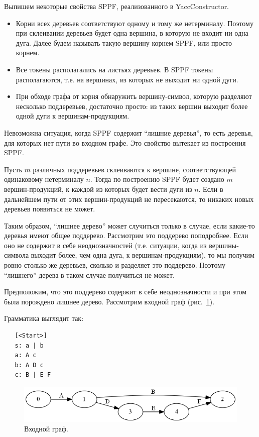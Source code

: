 Выпишем некоторые свойства SPPF, реализованного в YaccConstructor. 
\begin{itemize}
\item Корни всех деревьев соответствуют одному и тому же нетерминалу. Поэтому при склеивании деревьев будет одна вершина, в которую не входит ни одна дуга. Далее будем называть такую вершину корнем SPPF, или просто корнем. 
\item Все токены располагались на листьях деревьев. В SPPF токены располагаются, т.е. на вершинах, из которых не выходит ни одной дуги.
\item При обходе графа от корня обнаружить вершину-символ, которую разделяют несколько поддеревьев, достаточно просто: из таких вершин выходит более одной дуги к вершинам-продукциям. 
\end{itemize}

Невозможна ситуация, когда SPPF содержит ``лишние деревья'', то есть деревья, для которых нет пути во входном графе. Это свойство вытекает из построения SPPF. 

Пусть $m$ различных поддеревьев склеиваются к вершине, соответствующей одинаковому нетерминалу $n$. Тогда по построению SPPF будет создано $m$ вершин-продукций, к каждой из которых будет вести дуги из $n$. Если в дальнейшем пути от этих вершин-продукций не пересекаются, то никаких новых деревьев появиться не может. 

Таким образом, ``лишнее дерево'' может случиться только в случае, если какие-то деревья имеют общее поддерево. Рассмотрим это поддерево поподробнее. Если оно не содержит в себе неоднозначностей (т.е. ситуации, когда из вершины-символа выходит более, чем одна дуга, к вершинам-продукциям), то мы получим ровно столько же деревьев, сколько и разделяет это поддерево. Поэтому ``лишнего'' дерева в таком случае получиться не может. 

Предположим, что это поддерево содержит в себе неоднозначности и при этом была порождено лишнее дерево. Рассмотрим входной граф (рис.~\ref{sppf_proof_input}). 

Грамматика выглядит так:

\begin{verbatim}
   [<Start>]
   s: a | b
   a: A c
   b: A D c
   c: B | E F
\end{verbatim}

\begin{figure}[t]
\centering
\includegraphics[width=\linewidth]{Ivanov/Pictures/SPPF_proof_input.png}
\caption{Входной граф.}
\label{sppf_proof_input}
\end{figure}

